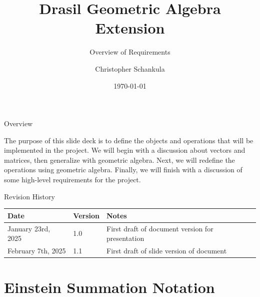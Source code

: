 \documentclass[aspectratio=169,xcolor=dvipsnames]{beamer}
\title{Drasil Geometric Algebra Extension}
\subtitle{Overview of Requirements}
\author{Christopher Schankula}
\institute
{
    Department of Computing \& Software \\
    McMaster University %
}
\date{\today} %
\begin{document}
\begin{frame}
    \titlepage
\end{frame}

\begin{frame}{Overview}
    \tableofcontents

    The purpose of this slide deck is to define the objects and operations that will
    be implemented in the project. We will begin with a discussion about vectors and
    matrices, then generalize with geometric algebra. Next, we will redefine the
    operations using geometric algebra. Finally, we will finish with a discussion of
    some high-level requirements for the project.
\end{frame}

\begin{frame}{Revision History}
      \begin{tabularx}{\textwidth}{p{4cm}p{2cm}X}
            \toprule {\bf Date} & {\bf Version} & {\bf Notes}\\
            \midrule
            January 23rd, 2025 & 1.0 & First draft of document version for presentation\\
            February 7th, 2025 & 1.1 & First draft of slide version of document\\
            \bottomrule
      \end{tabularx}
\end{frame}

\section{Einstein Summation Notation}
\end{document}
